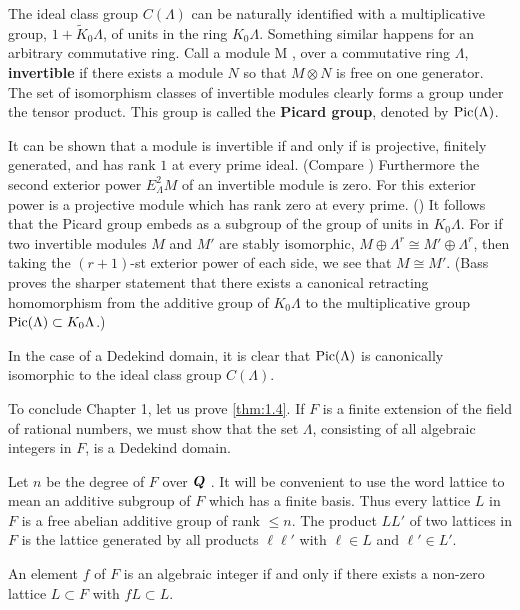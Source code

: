 \begin{rem*}
	The ideal class group $C(\Lambda)$ can be naturally identified with a multiplicative group, $1+\tilde{K}_{0} \Lambda$, of units in the ring $K_{0} \Lambda$. Something similar happens for an arbitrary commutative ring. Call a module M , over a commutative ring $\Lambda$, \textbf{invertible} if there exists a module $N$ so that $M \otimes N$ is free on one generator. The set of isomorphism classes of invertible modules clearly forms a group under the tensor product. This group is called the \textbf{Picard group}, denoted by $\operatorname{Pic}(\Lambda)$.

	It can be shown that a module is invertible if and only if is projective, finitely generated, and has rank $1$ at every prime ideal. (Compare \cite{bourbaki143}) Furthermore the second exterior power $E_{\Lambda}^{2} M$ of an invertible module is zero. For this exterior power is a projective module which has rank zero at every prime. (\cite{bourbaki112}) It follows that the Picard group embeds as a subgroup of the group of units in $K_{0} \Lambda$. For if two invertible modules $M$ and $M'$ are stably isomorphic, $M \oplus \Lambda^{r} \cong M' \oplus \Lambda^{r}$, then taking the $(r+1)$-st exterior power of each side, we see that $M \cong M'$. (Bass proves the sharper statement that there exists a canonical retracting homomorphism from the additive group of $K_{0} \Lambda$ to the multiplicative group $\operatorname{Pic}(\Lambda) \subset K_{0} \Lambda$.)

	In the case of a Dedekind domain, it is clear that $\operatorname{Pic}(\Lambda)$ is canonically isomorphic to the ideal class group $C(\Lambda)$.
\end{rem*}

To conclude Chapter 1, let us prove \autoref{thm:1.4}. If $F$ is a finite extension of the field of rational numbers, we must show that the set $\Lambda$, consisting of all algebraic integers in $F$, is a Dedekind domain.

Let $n$ be the degree of $F$ over $\bm{Q}$ . It will be convenient to use the word lattice to mean an additive subgroup of $F$ which has a finite basis. Thus every lattice $L$ in $F$ is a free abelian additive group of rank $\leq n$. The product $LL'$ of two lattices in $F$ is the lattice generated by all products $\ell \ell'$ with $\ell \in L$ and $\ell' \in L'$.

\begin{lem}\label{1.12}
	An element $f$ of $F$ is an algebraic integer if and only if there exists a non-zero lattice $L \subset F$ with $fL \subset L$.
\end{lem}

